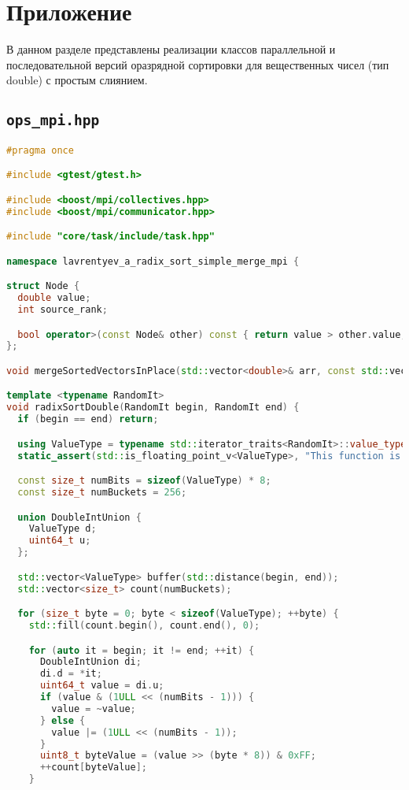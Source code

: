 \documentclass[12pt]{article}
\begin{document}
\appendix
\newpage
\section*{Приложение}

В данном разделе представлены реализации классов параллельной и последовательной версий оразрядной сортировки для вещественных чисел (тип double) с простым слиянием.


\subsection*{\texttt{ops\_mpi.hpp}}

\begin{lstlisting}[language=C++]
#pragma once

#include <gtest/gtest.h>

#include <boost/mpi/collectives.hpp>
#include <boost/mpi/communicator.hpp>

#include "core/task/include/task.hpp"

namespace lavrentyev_a_radix_sort_simple_merge_mpi {

struct Node {
  double value;
  int source_rank;

  bool operator>(const Node& other) const { return value > other.value; }
};

void mergeSortedVectorsInPlace(std::vector<double>& arr, const std::vector<int>& sizes, const std::vector<int>& displs);

template <typename RandomIt>
void radixSortDouble(RandomIt begin, RandomIt end) {
  if (begin == end) return;

  using ValueType = typename std::iterator_traits<RandomIt>::value_type;
  static_assert(std::is_floating_point_v<ValueType>, "This function is designed for floating-point types.");

  const size_t numBits = sizeof(ValueType) * 8;
  const size_t numBuckets = 256;

  union DoubleIntUnion {
    ValueType d;
    uint64_t u;
  };

  std::vector<ValueType> buffer(std::distance(begin, end));
  std::vector<size_t> count(numBuckets);

  for (size_t byte = 0; byte < sizeof(ValueType); ++byte) {
    std::fill(count.begin(), count.end(), 0);

    for (auto it = begin; it != end; ++it) {
      DoubleIntUnion di;
      di.d = *it;
      uint64_t value = di.u;
      if (value & (1ULL << (numBits - 1))) {
        value = ~value;
      } else {
        value |= (1ULL << (numBits - 1));
      }
      uint8_t byteValue = (value >> (byte * 8)) & 0xFF;
      ++count[byteValue];
    }


\end{lstlisting}
\end{document}
